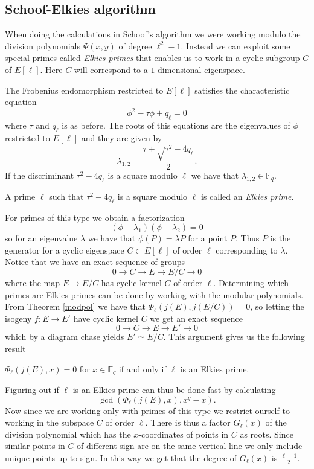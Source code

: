 \subsection{Schoof-Elkies algorithm}
When doing the calculations in Schoof's algorithm we were working modulo the division
polynomials $\Psi(x,y)$ of degree $\ell^2-1$. Instead we can exploit some special primes
called \emph{Elkies primes} that enables us to work in a cyclic subgroup $C$ of $E[\ell]$.
Here $C$ will correspond to a $1$-dimensional eigenspace.

The Frobenius endomorphism restricted to $E[\ell]$ satisfies the characteristic equation
$$ \phi^2 - \tau \phi + q_\ell = 0 $$
where $\tau$ and $q_\ell$ is as before. The roots of this equations are the eigenvalues
of $\phi$ restricted to $E[\ell]$ and they are given by
$$ \lambda_{1,2} = \frac{\tau \pm \sqrt{\tau^2 - 4 q_\ell}}{2}. $$
If the discriminant $\tau^2 - 4 q_\ell$ is a square modulo $\ell$ we have that
$\lambda_{1,2} \in \mathbb{F}_q$.
\begin{mydef}
A prime $\ell$ such that $\tau^2 - 4 q_\ell$ is a square modulo $\ell$ is called
an \emph{Elkies prime}.
\end{mydef}
For primes of this type we obtain a factorization
$$ (\phi - \lambda_1)(\phi - \lambda_2) = 0 $$
so for an eigenvalue $\lambda$ we have that $\phi(P) = \lambda P$ for a point $P$. Thus
$P$ is the generator for a cyclic eigenspace $C \subset E[\ell]$ of order $\ell$
corresponding to $\lambda$.
Notice that we have an exact sequence of groups
$$ 0 \rightarrow C \rightarrow E \rightarrow E/C \rightarrow 0 $$
where the map $E \rightarrow E/C$ has cyclic kernel $C$ of order $\ell$.
Determining which primes are Elkies primes can be done by working with the
modular polynomials. From Theorem \ref{modpol} we have that $\Phi_\ell(j(E),j(E/C)) = 0$,
so letting the isogeny $f: E \rightarrow E'$ have cyclic kernel $C$ we get an exact
sequence
$$ 0 \rightarrow C \rightarrow E \rightarrow E' \rightarrow 0 $$
which by a diagram chase yields $ E' \simeq E/C $. This argument gives us the following result
\begin{prop}
 $ \Phi_\ell(j(E), x) = 0$ for $x \in \mathbb{F}_q$ if and only if $\ell$ is an Elkies
prime.
\end{prop}
Figuring out if $\ell$ is an Elkies prime can thus be done fast by calculating
$$\gcd(\Phi_\ell(j(E), x), x^q - x).$$
Now since we are working only with primes of this type we restrict ourself to working
in the subspace $C$ of order $\ell$. There is thus a factor $G_\ell(x)$ of the division polynomial
which has the $x$-coordinates of points in $C$ as roots. Since
similar points in $C$ of different sign are on the same vertical line we only include
unique points up to sign. In this way we get that the degree of $G_\ell(x)$ is $\frac{\ell-1}{2}$.

